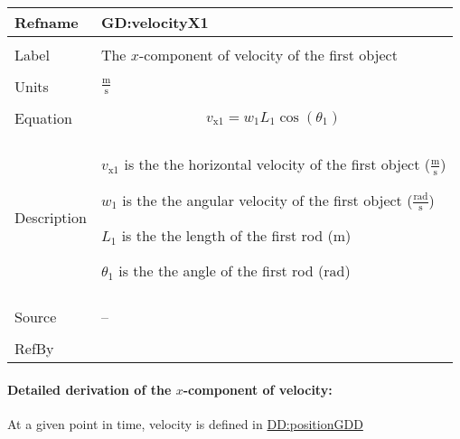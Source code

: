 \documentclass[12pt]{article}
\begin{document}
\vspace{\baselineskip}
\noindent
\begin{minipage}{\textwidth}
\begin{tabular}{>{\raggedright}p{}>{\raggedright\arraybackslash}p{}}
\toprule \textbf{Refname} & \textbf{GD:velocityX1}
\label{GD:velocityX1}
\\ \midrule \\
Label & The $x$-component of velocity of the first object
        
\\ \midrule \\
Units & $\frac{\text{m}}{\text{s}}$
        
\\ \midrule \\
Equation & \begin{displaymath}
           {v_{\text{x}1}}={w_{1}} {L_{1}} \cos\left({θ_{1}}\right)
           \end{displaymath}
\\ \midrule \\
Description & \begin{symbDescription}
              \item{${v_{\text{x}1}}$ is the the horizontal velocity of the first object ($\frac{\text{m}}{\text{s}}$)}
              \item{${w_{1}}$ is the the angular velocity of the first object ($\frac{\text{rad}}{\text{s}}$)}
              \item{${L_{1}}$ is the the length of the first rod (${\text{m}}$)}
              \item{${θ_{1}}$ is the the angle of the first rod (${\text{rad}}$)}
              \end{symbDescription}
\\ \midrule \\
Source & --
         
\\ \midrule \\
RefBy & 
\\ \bottomrule
\end{tabular}
\end{minipage}
\paragraph{Detailed derivation of the $x$-component of velocity:}
\label{GD:velocityX1Deriv}
At a given point in time, velocity is defined in \hyperref[DD:positionGDD]{DD:positionGDD}
\end{document}
